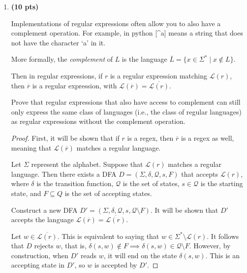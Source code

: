 \documentclass[11pt]{article}
\begin{document}
\begin{enumerate}[label=\textbf{Q\arabic*.}]
\begin{enumerate}[label=\textit{\alph*)}]
\begin{proof}
		Therefore, since this DFA accepts exactly \(L\), it is correct and the proof is done.
	\end{proof}
\end{enumerate}

\newpage

\item \textbf{(10 pts)}

Implementations of regular expressions often allow you to also have a complement operation. For example, in python [\^{}a] means a string that does not have the character `a' in it. 

More formally,  the \textit{complement} of $L$ is the language $\overline{L} = \{x \in \Sigma^* \mid x \notin L\}$. 

Then in regular expressions, if $r$ is a regular expression matching $\mathcal{L}(r)$, then $\overline{r}$ is a regular expression, with $\mathcal{L}(\overline{r}) = \overline{\mathcal{L}(r)}$. 



Prove that regular expressions that also have access to complement can still only express the same class of languages (i.e., the class of regular languages) as regular expressions without the complement operation. 

\begin{proof}
	First, it will be shown that if \(r\) is a regex, then \(\overline{r}\) is a regex as well, meaning that \(\mathcal{L} (\overline{r})\) matches a regular language.

	Let \(\Sigma\) represent the alphabet. Suppose that \(\mathcal{L} (r)\) matches a regular language. Then there exists a DFA \(D = (\Sigma, \delta, \mathcal{Q}, s, F)\) that accepts \(\mathcal{L} (r)\), where \(\delta\) is the transition function, \(\mathcal{Q}\) is the set of states, \(s \in \mathcal{Q}\) is the starting state, and \(F \subseteq Q\) is the set of accepting states.

	Construct a new DFA \(D' = (\Sigma , \delta , \mathcal{Q} , s, \mathcal{Q} \setminus F)\). It will be shown that \(D'\) accepts the language \(\mathcal{L} (\overline{r}) = \overline{\mathcal{L}(r)}\).

	Let \(w \in \overline{\mathcal{L} (r)}\). This is equivalent to saying that \(w \in \Sigma^* \setminus \mathcal{L} (r)\). It follows that \(D\) rejects \(w\), that is, \(\delta (s,w) \notin F \implies \delta (s,w) \in \mathcal{Q} \setminus F\). However, by construction, when \(D'\) reads \(w\), it will end on the state \(\delta (s,w)\). This is an accepting state in \(D'\), so \(w\) is accepted by \(D'\).


\end{proof}
\end{enumerate}
\end{document}
